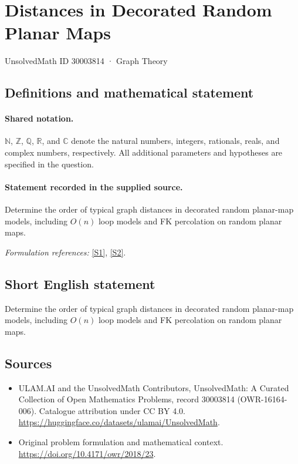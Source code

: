 \documentclass[11pt]{article}
\newcommand{\sref}[2]{\hyperlink{source:#1:#2}{[S#2]}}
\begin{document}
\setcounter{section}{30003813}
\section{Distances in Decorated Random Planar Maps}\label{30003814}
{\small UnsolvedMath ID 30003814 · Graph Theory}
\subsection{Definitions and mathematical statement}

\paragraph{Shared notation.}$\mathbb N$, $\mathbb Z$, $\mathbb Q$, $\mathbb R$, and $\mathbb C$ denote the natural numbers, integers, rationals, reals, and complex numbers, respectively. All additional parameters and hypotheses are specified in the question.


\paragraph{Statement recorded in the supplied source.}
Determine the order of typical graph distances in decorated random planar-map models, including $O(n)$ loop models and FK percolation on random planar maps.
\par\smallskip\textit{Formulation references:} \sref{30003814}{1}, \sref{30003814}{2}.
\subsection{Short English statement}
Determine the order of typical graph distances in decorated random planar-map models, including $O(n)$ loop models and FK percolation on random planar maps.
\subsection{Sources}
\begin{itemize}
\item[\hypertarget{source:30003814:1}{S1}] ULAM.AI and the UnsolvedMath Contributors, UnsolvedMath: A Curated Collection of Open Mathematics Problems, record 30003814 (OWR-16164-006). Catalogue attribution under CC BY 4.0.
\url{https://huggingface.co/datasets/ulamai/UnsolvedMath}.
\item[\hypertarget{source:30003814:2}{S2}] Original problem formulation and mathematical context.
\url{https://doi.org/10.4171/owr/2018/23}.
\end{itemize}
\label{end:30003814}
\end{document}
